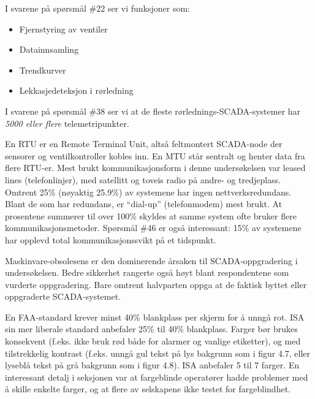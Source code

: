












I svarene på spørsmål \#22 ser vi funksjoner som:

\begin{itemize}
\item{} Fjernstyring av ventiler
\item{} Datainnsamling
\item{} Trendkurver
\item{} Lekkasjedeteksjon i rørledning
\end{itemize}

\vskip 10pt

I svarene på spørsmål \#38 ser vi at de fleste rørlednings-SCADA-systemer har {\it 5000 eller flere} telemetripunkter.

\vskip 10pt

En RTU er en Remote Terminal Unit, altså feltmontert SCADA-node der sensorer og ventilkontroller kobles inn.  En MTU står sentralt og henter data fra flere RTU-er.  Mest brukt kommunikasjonsform i denne undersøkelsen var leased lines (telefonlinjer), med satellitt og toveis radio på andre- og tredjeplass.  Omtrent 25\% (nøyaktig 25.9\%) av systemene har ingen nettverksredundans.  Blant de som har redundans, er ``dial-up'' (telefonmodem) mest brukt.  At prosentene summerer til over 100\% skyldes at samme system ofte bruker flere kommunikasjonsmetoder.  Spørsmål \#46 er også interessant: 15\% av systemene har opplevd total kommunikasjonssvikt på et tidspunkt.

\vskip 10pt

Maskinvare-obsolesens er den dominerende årsaken til SCADA-oppgradering i undersøkelsen.  Bedre sikkerhet rangerte også høyt blant respondentene som vurderte oppgradering.  Bare omtrent halvparten oppga at de faktisk byttet eller oppgraderte SCADA-systemet.

\vskip 10pt

En FAA-standard krever minst 40\% blankplass per skjerm for å unngå rot.  ISA sin mer liberale standard anbefaler 25\% til 40\% blankplass.  Farger bør brukes konsekvent (f.eks. ikke bruk rød både for alarmer og vanlige etiketter), og med tilstrekkelig kontrast (f.eks. unngå gul tekst på lys bakgrunn som i figur 4.7, eller lyseblå tekst på grå bakgrunn som i figur 4.8).  ISA anbefaler 5 til 7 farger.  En interessant detalj i seksjonen var at fargeblinde operatører hadde problemer med å skille enkelte farger, og at flere av selskapene ikke testet for fargeblindhet.

